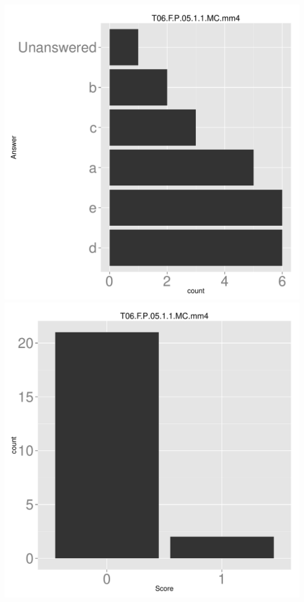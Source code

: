 \documentclass[12pt,nohyper]{tufte-handout}\usepackage[]{graphicx}\usepackage[]{color}
\begin{document}
\begin{center} \includegraphics[width=.45\linewidth]{Topic06_60_answer} \includegraphics[width=.45\linewidth]{Topic06_60_score} \end{center} 
\end{document}
